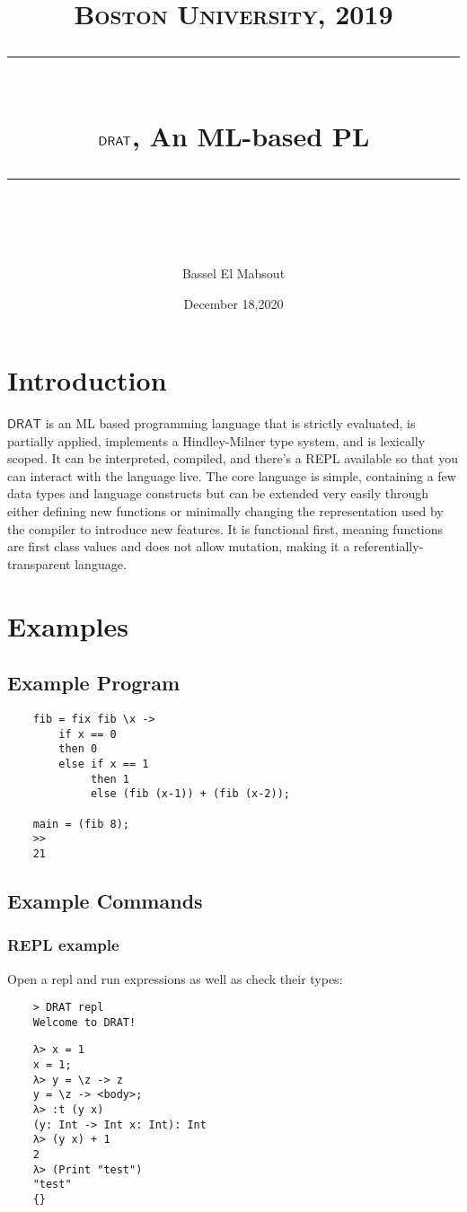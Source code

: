 \documentclass{article} %
\title{
\normalfont \normalsize 
\textsc{Boston University, 2019} \\
[10pt] 
\rule{\linewidth}{0.5pt} \\[6pt] 
\huge $\DRAT$, An ML-based PL \\
\rule{\linewidth}{2pt}  \\[10pt]
}
\author{Bassel El Mabsout}
\date{\normalsize December 18,2020}
\newcommand{\DRAT}{\mathsf{DRAT}}
\begin{document}
\maketitle
\noindent

\tableofcontents

\newpage

\section{Introduction}
    $\DRAT$ is an ML based programming language that is strictly evaluated, is partially applied, implements a Hindley-Milner type system, and is lexically scoped. It can be interpreted, compiled, and there's a REPL available so that you can interact with the language live. The core language is simple, containing a few data types and language constructs but can be extended very easily through either defining new functions or minimally changing the representation used by the compiler to introduce new features. It is functional first, meaning functions are first class values and does not allow mutation, making it a referentially-transparent language. 
\section{Examples}
\subsection{Example Program}
\begin{verbatim}
    fib = fix fib \x ->
        if x == 0
        then 0
        else if x == 1
             then 1
             else (fib (x-1)) + (fib (x-2));
    
    main = (fib 8);
    >>
    21
\end{verbatim}

\subsection{Example Commands}
\subsubsection{REPL example}
Open a repl and run expressions as well as check their types:
\begin{verbatim}
    > DRAT repl
    Welcome to DRAT!
\end{verbatim}
\begin{verbatim}
    λ> x = 1
    x = 1;
    λ> y = \z -> z
    y = \z -> <body>;
    λ> :t (y x)
    (y: Int -> Int x: Int): Int
    λ> (y x) + 1
    2
    λ> (Print "test")
    "test"
    {}
\end{verbatim}
\end{document}
